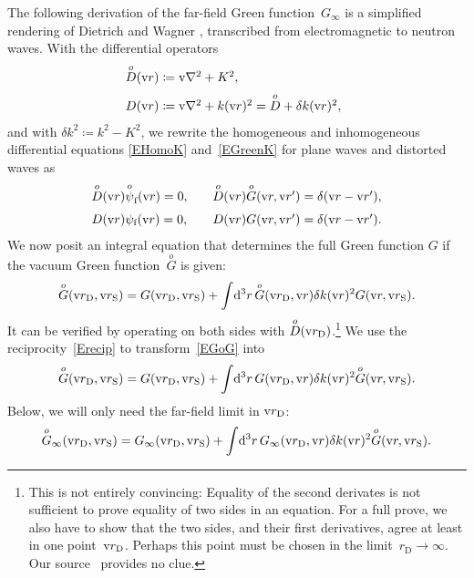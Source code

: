 \def\Do{\overset{o}{D}}
\def\Go{\overset{o}{G}}
\def\pfo{\overset{o}{\psi}_\sf}

The following derivation of the far-field Green function~$G_\infty$
%
is a simplified rendering of Dietrich and Wagner \cite{DiWa84},
transcribed from electromagnetic to neutron waves.
With the differential operators
\begin{equation}\label{EDDdef}
  \begin{array}{@{}l}
    \Do(\r) \coloneqq \Nabla^2+K^2, \\[1.4ex]
    D(\r) \coloneqq \Nabla^2+k(\r)^2 = \Do + \delta k(\r)^2,
  \end{array}
\end{equation}
and with $\delta k^2\coloneqq k^2-K^2$,
we rewrite the homogeneous and inhomogeneous differential equations \cref{EHomoK}
and~\cref{EGreenK} for plane waves and distorted waves as
\begin{equation}
  \begin{array}{l@{\hspace{2em}}l}
    \Do(\r)\pfo  (\r) = 0, &\Do(\r)\Go(\r,\r') = \delta(\r-\r'), \\[1.4ex]
    D(\r)\psi_\sf(\r) = 0, &D(\r)  G  (\r,\r') = \delta(\r-\r').
  \end{array}
\end{equation}
We now posit an integral equation that determines
the full Green function $G$ if the vacuum Green function~$\Go$ is given:
\begin{equation}\label{EGoG}
  \Go(\rD,\rS) = G(\rD,\rS) + \int\!\d^3r\, \Go(\rD,\r)\delta k(\r)^2 G(\r,\rS).
\end{equation}
It can be verified by operating on both sides with $\Do(\rD)$.\footnote
{This is not entirely convincing:
Equality of the second derivates is not sufficient to prove equality of
two sides in an equation.
For a full prove, we also have to show that the two sides, and their first derivatives,
agree at least in one point~$\text{v}{r}_\text{D}$.
Perhaps this point must be chosen in the limit~$r_\text{D}\to\infty$.
Our source~\cite{DiWa84} provides no clue.}
We use the reciprocity~\cref{Erecip} to transform~\cref{EGoG} into
\begin{equation}
  \Go(\rD,\rS) = G(\rD,\rS) + \int\!\d^3r\, G(\rD,\r)\delta k(\r)^2 \Go(\r,\rS).
\end{equation}
Below, we will only need the far-field limit in $\text{v}{r}_\text{D}$:
\begin{equation}\label{EGoFF}
  \Go_\infty(\rD,\rS) = G_\infty(\rD,\rS) + \int\!\d^3r\, G_\infty(\rD,\r)\delta k(\r)^2 \Go(\r,\rS).
\end{equation}
